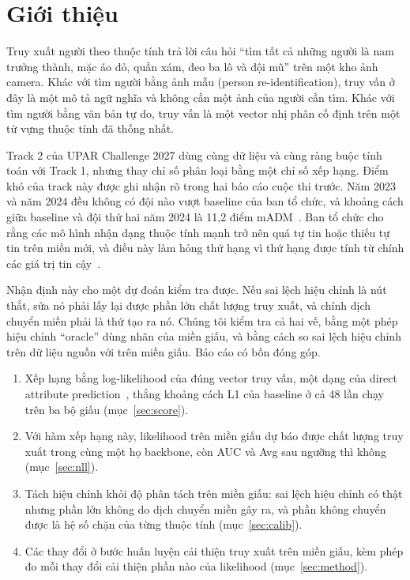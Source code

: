 \documentclass[11pt,a4paper]{article}
\begin{document}
\section{Giới thiệu}

Truy xuất người theo thuộc tính trả lời câu hỏi ``tìm tất cả những người là nam trưởng thành, mặc áo đỏ, quần xám, đeo ba lô và đội mũ'' trên một kho ảnh camera. Khác với tìm người bằng ảnh mẫu (person re-identification), truy vấn ở đây là một mô tả ngữ nghĩa và không cần một ảnh của người cần tìm. Khác với tìm người bằng văn bản tự do, truy vấn là một vector nhị phân cố định trên một từ vựng thuộc tính đã thống nhất. 

Track 2 của UPAR Challenge 2027 dùng cùng dữ liệu và cùng ràng buộc tính toán với Track 1, nhưng thay chỉ số phân loại bằng một chỉ số xếp hạng. Điểm khó của track này được ghi nhận rõ trong hai báo cáo cuộc thi trước. Năm 2023 và năm 2024 đều không có đội nào vượt baseline của ban tổ chức, và khoảng cách giữa baseline và đội thứ hai năm 2024 là 11,2 điểm mADM~\cite{upar23,upar24}. Ban tổ chức cho rằng các mô hình nhận dạng thuộc tính mạnh trở nên quá tự tin hoặc thiếu tự tin trên miền mới, và điều này làm hỏng thứ hạng vì thứ hạng được tính từ chính các giá trị tin cậy~\cite{upar24}.

Nhận định này cho một dự đoán kiểm tra được. Nếu sai lệch hiệu chỉnh là nút thắt, sửa nó phải lấy lại được phần lớn chất lượng truy xuất, và chính dịch chuyển miền phải là thứ tạo ra nó. Chúng tôi kiểm tra cả hai vế, bằng một phép hiệu chỉnh ``oracle'' dùng nhãn của miền giấu, và bằng cách so sai lệch hiệu chỉnh trên dữ liệu nguồn với trên miền giấu. Báo cáo có bốn đóng góp.

\begin{enumerate}[leftmargin=1.4em]
\item Xếp hạng bằng log-likelihood của đúng vector truy vấn, một dạng của direct attribute prediction~\cite{dap}, thắng khoảng cách L1 của baseline ở cả 48 lần chạy trên ba bộ giấu (mục~\ref{sec:score}).
\item Với hàm xếp hạng này, likelihood trên miền giấu dự báo được chất lượng truy xuất trong cùng một họ backbone, còn AUC và Avg sau ngưỡng thì không (mục~\ref{sec:nll}).
\item Tách hiệu chỉnh khỏi độ phân tách trên miền giấu: sai lệch hiệu chỉnh có thật nhưng phần lớn không do dịch chuyển miền gây ra, và phần không chuyển được là hệ số chặn của từng thuộc tính (mục~\ref{sec:calib}).
\item Các thay đổi ở bước huấn luyện cải thiện truy xuất trên miền giấu, kèm phép đo mỗi thay đổi cải thiện phần nào của likelihood (mục~\ref{sec:method}).
\end{enumerate}
\end{document}
